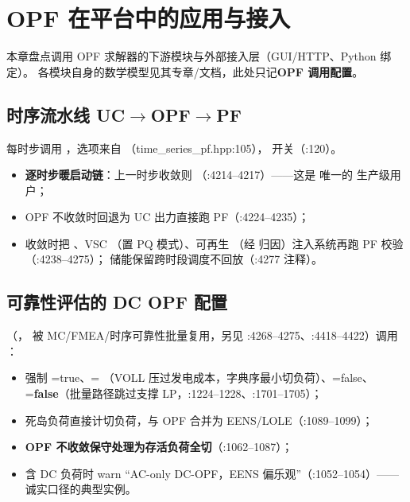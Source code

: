 \section{OPF 在平台中的应用与接入}\label{sec:applications}

本章盘点调用 OPF 求解器的下游模块与外部接入层（GUI/HTTP、Python 绑定）。
各模块自身的数学模型见其专章/文档，此处只记\textbf{OPF 调用配置}。

\subsection{时序流水线 UC$\to$OPF$\to$PF}
 每时步调用
，选项来自
（time\_series\_pf.hpp:105），
开关（:120）。
\begin{itemize}
  \item \textbf{逐时步暖启动链}：上一时步收敛则 （:4214--4217）——这是  唯一的
        生产级用户；
  \item OPF 不收敛时回退为 UC 出力直接跑 PF（:4224--4235）；
  \item 收敛时把 、VSC （置 PQ 模式）、可再生 
        （经  归因）注入系统再跑 PF 校验（:4238--4275）；
        储能保留跨时段调度不回放（:4277 注释）。
\end{itemize}

\subsection{可靠性评估的 DC OPF 配置}
（，
被 MC/FMEA/时序可靠性批量复用，另见 :4268--4275、:4418--4422）调用
：
\begin{itemize}
  \item 强制 =true、=
        （VOLL 压过发电成本，字典序最小切负荷）、=false、
        =\textbf{false}（批量路径跳过支撑 LP，:1224--1228、:1701--1705）；
  \item 死岛负荷直接计切负荷，与 OPF  合并为
        EENS/LOLE（:1089--1099）；
  \item \textbf{OPF 不收敛保守处理为存活负荷全切}（:1062--1087）；
  \item 含 DC 负荷时 warn ``AC-only DC-OPF，EENS 偏乐观''（:1052--1054）——
        诚实口径的典型实例。
\end{itemize}

